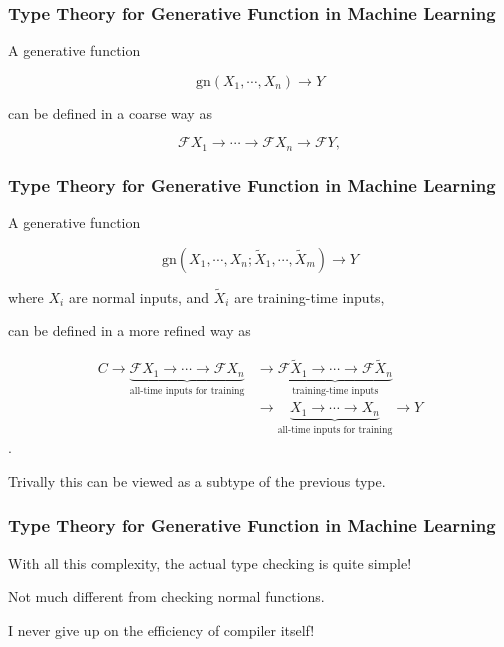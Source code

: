 \documentclass{beamer}   	%
\theoremstyle{definition}
\begin{document}
\begin{frame}
\frametitle{Type Theory for Generative Function in Machine Learning}

A generative function

$$\text{gn}(X_1,\cdots,X_n) \to Y$$

can be defined in a coarse way as

\begin{equation} 
	 \mathscr{F}X_1\to \cdots \to\mathscr{F}X_n\to \mathscr{F}Y,
\end{equation}
\end{frame}

\begin{frame}
\frametitle{Type Theory for Generative Function in Machine Learning}

A generative function

$$\text{gn}(X_1,\cdots,X_n;\tilde X_1,\cdots,\tilde X_m) \to Y$$

where $X_i$ are normal inputs, and $\tilde X_i$ are training-time inputs,

can be defined in a more refined way as

\begin{equation}
	\begin{split}
	 C\to \underbrace{\mathscr{F}X_1\to \cdots \to\mathscr{F}X_n}_{\text{all-time inputs for training}}
	 &\to \underbrace{\mathscr{F}\tilde X_1\to \cdots \to\mathscr{F}\tilde X_n}_{\text{training-time inputs}}\\
	 &\to \underbrace{X_1 \to \cdots \to X_n}_{\text{all-time inputs for training}} \to Y
	\end{split}
\end{equation}.

Trivally this can be viewed as a subtype of the previous type.
\end{frame}

\begin{frame}
\frametitle{Type Theory for Generative Function in Machine Learning}
With all this complexity, the actual type checking is quite simple!

Not much different from checking normal functions.

I never give up on the efficiency of compiler itself!
\end{frame}
\end{document}
